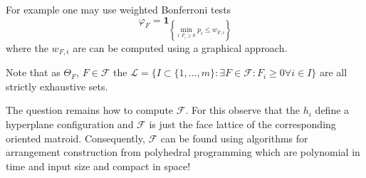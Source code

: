 \documentclass[a4paper,12pt]{article}
\newcommand{\indf}[1]{\mathbf{1}_{\left\{#1\right\}}}
\begin{document}
For example one may use  weighted Bonferroni tests
\begin{equation}
  \label{eq:bonferroni}
  \varphi_F = \indf{\min_{i:F_i \geq 0}p_i \leq w_{F,i}}
\end{equation}
where the $w_{F,i}$ are can be computed using a graphical approach.

Note that as $\Theta_F$, $F \in \mathcal{F}$ the $\mathscr{L} = \{I \subset \{1,...,m\}: \exists F \in
\mathcal{F}: F_i \geq 0 \forall i \in I\}$ are all strictly exhaustive sets.  

The question remains how to compute $\mathcal{F}$. For this observe
that the $h_i$ define a hyperplane configuration and $\mathcal{F}$ is
just the face lattice of the corresponding oriented
matroid. Consequently, $\mathcal{F}$ can be found using algorithms
for arrangement construction from polyhedral programming
\cite{Avis-KF-92,Avis-KF-96,Ferrez-KF-Liebling-01} which are
polynomial in time and input size and compact in space!
\end{document}

